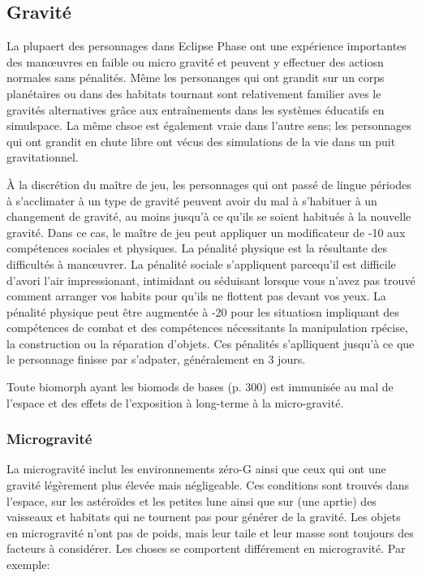 \subsection{Gravité} \label{sec:gravity} 

La plupaert des personnages dans Eclipse Phase ont une expérience importantes des manœuvres en faible ou micro gravité et peuvent y effectuer des actiosn normales sans pénalités. Même les personanges qui ont grandit sur un corps planétaires ou dans des habitats tournant sont relativement familier aves le gravités alternatives grâce aux entraînements dans les systèmes éducatifs en simulspace. La même chsoe est également vraie dans l'autre sens; les personnages qui ont grandit en chute libre ont vécus des simulations de la vie dans un puit gravitationnel. 

À la discrétion du maître de jeu, les personnages qui ont passé de lingue périodes à s'acclimater à un type de gravité peuvent avoir du mal à s'habituer à un changement de gravité, au moins jusqu'à ce qu'ils se soient habitués à la nouvelle gravité. Dans ce cas, le maître de jeu peut appliquer un modificateur de -10 aux compétences sociales et physiques. La pénalité physique est la résultante des difficultés à manœuvrer. La pénalité sociale s'appliquent parcequ'il est difficile d'avori l'air impressionant, intimidant ou séduisant lorsque vous n'avez pas trouvé comment arranger vos habits pour qu'ils ne flottent pas devant vos yeux. La pénalité physique peut être augmentée à -20 pour les situatiosn impliquant des compétences de combat et des compétences nécessitants la manipulation rpécise, la construction ou la réparation d'objets. Ces pénalités s'aplliquent jusqu'à ce que le personnage finisse par s'adpater, généralement en 3 jours. 

Toute biomorph ayant les biomods de bases (p. 300) est immunisée au mal de l'espace et des effets de l'exposition à long-terme à la micro-gravité. 

\subsubsection{Microgravité} 

La microgravité inclut les environnements zéro-G ainsi que ceux qui ont une gravité légèrement plus élevée mais négligeable. Ces conditions sont trouvés dans l'espace, sur les astéroïdes et les petites lune ainsi que sur (une aprtie) des vaisseaux et habitats qui ne tournent pas pour générer de la gravité. Les objets en microgravité n'ont pas de poids, mais leur taile et leur masse sont toujours des facteurs à considérer. Les choses se comportent différement en microgravité. Par exemple: 

